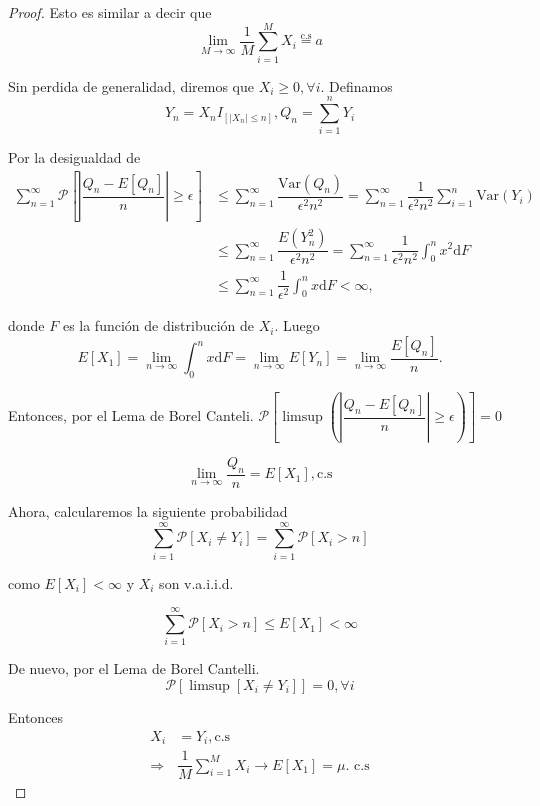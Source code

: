 \documentclass[
  letterpaper,
  DIV=11,
  numbers=noendperiod]{scrreprt}
\theoremstyle{plain}
\theoremstyle{definition}
\theoremstyle{remark}
\begin{document}
\begin{proof}

Esto es similar a decir que \[
\lim_{M\to\infty}\dfrac{1}{M}\sum_{i=1}^{M}X_{i}\stackrel{\text{c.s}}{=}a
\]

Sin perdida de generalidad, diremos que \(X_{i}\geq0,\forall i\).
Definamos \[
Y_{n}=X_{n}I_{\left[\left|X_{n}\right|\leq n\right]},Q_{n}=\sum_{i=1}^{n}Y_{i}
\]

Por la desigualdad de \[
\begin{align*}
\sum_{n=1}^{\infty}\mathcal{P}\left[\left|\dfrac{Q_{n}-E\left[Q_{n}\right]}{n}\right|\geq\epsilon\right] & \leq\sum_{n=1}^{\infty}\dfrac{\text{Var}\left(Q_{n}\right)}{\epsilon^{2}n^{2}}=\sum_{n=1}^{\infty}\dfrac{1}{\epsilon^{2}n^{2}}\sum_{i=1}^{n}\text{Var}\left(Y_{i}\right)\\
& \leq\sum_{n=1}^{\infty}\dfrac{E\left(Y_{n}^{2}\right)}{\epsilon^{2}n^{2}}=\sum_{n=1}^{\infty}\dfrac{1}{\epsilon^{2}n^{2}}\int_{0}^{n}x^{2}\mathrm{d}F\\
& \leq\sum_{n=1}^{\infty}\dfrac{1}{\epsilon^{2}}\int_{0}^{n}x\mathrm{d}F<\infty,
\end{align*}
\]

donde \(F\) es la función de distribución de \(X_{i}\). Luego \[
E\left[X_{1}\right]=\lim_{n\to\infty}\int_{0}^{n}x\mathrm{d}F=\lim_{n\to\infty}E\left[Y_{n}\right]=\lim_{n\to\infty}\dfrac{E\left[Q_{n}\right]}{n}.
\]

Entonces, por el Lema de Borel Canteli.
\(\mathcal{\mathcal{P}}\left[\limsup\left(\left|\dfrac{Q_{n}-E\left[Q_{n}\right]}{n}\right|\geq\epsilon\right)\right]=0\)

\[
\lim_{n\to\infty}\dfrac{Q_{n}}{n}=E\left[X_{1}\right],\text{c.s}
\]

Ahora, calcularemos la siguiente probabilidad \[
\sum_{i=1}^{\infty}\mathcal{P}\left[X_{i}\neq Y_{i}\right]=\sum_{i=1}^{\infty}\mathcal{P}\left[X_{i}>n\right]
\]

como \(E\left[X_{i}\right]<\infty\) y \(X_{i}\) son v.a.i.i.d.

\[
\sum_{i=1}^{\infty}\mathcal{P}\left[X_{i}>n\right]\leq E\left[X_{1}\right]<\infty
\]

De nuevo, por el Lema de Borel Cantelli. \[
\mathcal{P}\left[\limsup\left[X_{i}\neq Y_{i}\right]\right]=0,\forall i
\]

Entonces \[
\begin{align*}
X_{i} & =Y_{i},\text{c.s}\\
\Rightarrow & \dfrac{1}{M}\sum_{i=1}^{M}X_{i}\to E\left[X_{1}\right]=\mu.\text{ c.s}
\end{align*}
\]

\end{proof}
\end{document}
